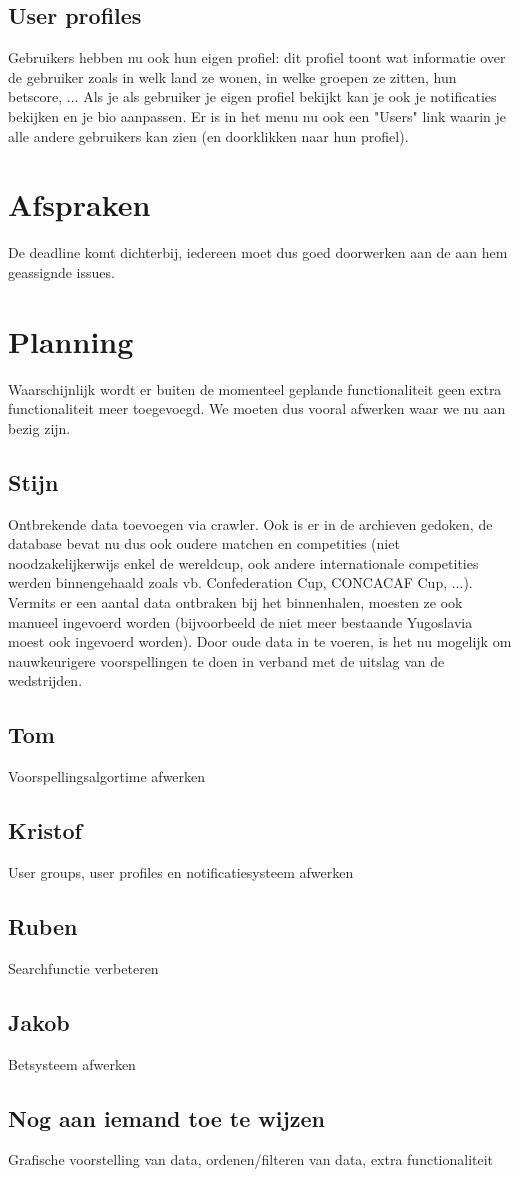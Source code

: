 \documentclass[11pt, a4paper]{article}
\begin{document}
\subsection{User profiles}
Gebruikers hebben nu ook hun eigen profiel: dit profiel toont wat informatie over de gebruiker zoals in welk land ze wonen, in welke groepen ze zitten, hun betscore, ...
Als je als gebruiker je eigen profiel bekijkt kan je ook je notificaties bekijken en je bio aanpassen.
Er is in het menu nu ook een "Users" link waarin je alle andere gebruikers kan zien (en doorklikken naar hun profiel).

\section{Afspraken}
De deadline komt dichterbij, iedereen moet dus goed doorwerken aan de aan hem geassignde issues.


\section{Planning}
Waarschijnlijk wordt er buiten de momenteel geplande functionaliteit geen extra functionaliteit meer toegevoegd. We moeten dus vooral afwerken waar we nu aan bezig zijn.
\subsection{Stijn}
Ontbrekende data toevoegen via crawler. Ook is er in de archieven gedoken, de database bevat nu dus ook oudere matchen en competities (niet noodzakelijkerwijs enkel de wereldcup, ook andere internationale competities werden binnengehaald zoals vb. Confederation Cup, CONCACAF Cup, ...). Vermits er een aantal data ontbraken bij het binnenhalen, moesten ze ook manueel ingevoerd worden (bijvoorbeeld de niet meer bestaande Yugoslavia moest ook ingevoerd worden). Door oude data in te voeren, is het nu mogelijk om nauwkeurigere voorspellingen te doen in verband met de uitslag van de wedstrijden.
\subsection{Tom}
Voorspellingsalgortime afwerken
\subsection{Kristof}
User groups, user profiles en notificatiesysteem afwerken
\subsection{Ruben}
Searchfunctie verbeteren
\subsection{Jakob}
Betsysteem afwerken
\subsection{Nog aan iemand toe te wijzen}
Grafische voorstelling van data, ordenen/filteren van data, extra functionaliteit
\end{document}
